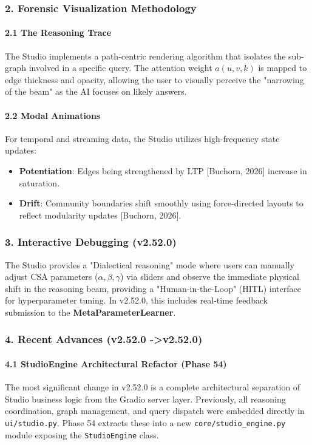 \subsubsection{2. Forensic Visual\-ization Methodology}

\paragraph{2.1 The Reasoning Trace}
The Studio implements a path-centric rendering algorithm that isolates the sub-graph involved in a specific query. The attention weight $a(u,v,k)$ is mapped to edge thickness and opacity, allowing the user to visually perceive the "narrowing of the beam" as the AI focuses on likely answers.

\paragraph{2.2 Modal Animations}
For temporal and streaming data, the Studio utilizes high-frequency state updates:
\begin{itemize}
\item \textbf{Potent\-iation}: Edges being stren\-gthened by LTP [Buchorn, 2026] increase in saturation.
\item \textbf{Drift}: Community boundaries shift smoothly using force-directed layouts to reflect modularity updates [Buchorn, 2026].

\end{itemize}
\subsubsection{3. Interactive Debugging (v2.52.0)}
The Studio provides a "Dialectical reasoning" mode where users can manually adjust CSA parameters ($\alpha, \beta, \gamma$) via sliders and observe the immediate physical shift in the reasoning beam, providing a "Human-in-the-Loop" (HITL) interface for hyper\-parameter tuning. In v2.52.0, this includes real-time feedback submission to the \textbf{MetaParameterLearner}.

\subsubsection{4. Recent Advances (v2.52.0 -\textgreater  v2.52.0)}

\paragraph{4.1 StudioEngine Archit\-ectural Refactor (Phase 54)}
The most significant change in v2.52.0 is a complete archi\-tectural separation of Studio business logic from the Gradio server layer. Previously, all reasoning coord\-ination, graph management, and query dispatch were embedded directly in \texttt{ui/studio.py}. Phase 54 extracts these into a new \texttt{core/studio\_engine.py} module exposing the \texttt{StudioEngine} class.

